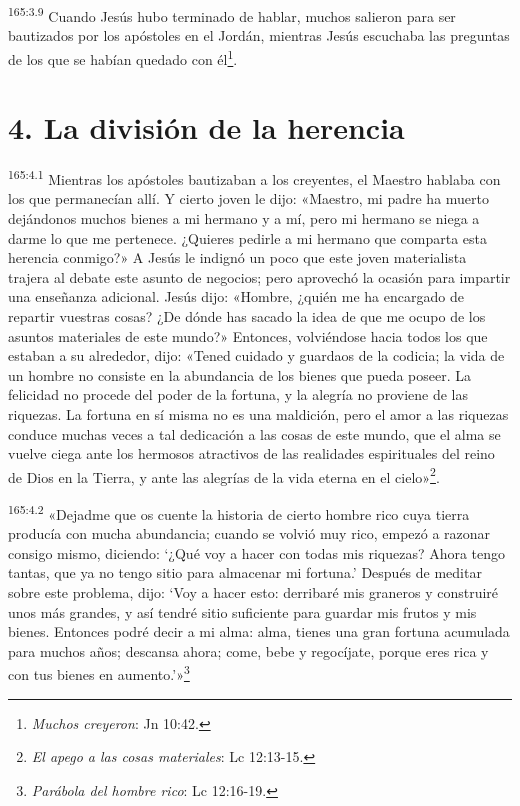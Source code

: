 \par 
\textsuperscript{165:3.9} Cuando Jesús hubo terminado de hablar, muchos salieron para ser bautizados por los apóstoles en el Jordán, mientras Jesús escuchaba las preguntas de los que se habían quedado con él\footnote{\textit{Muchos creyeron}: Jn 10:42.}.

\section*{4. La división de la herencia}
\par 
\textsuperscript{165:4.1} Mientras los apóstoles bautizaban a los creyentes, el Maestro hablaba con los que permanecían allí. Y cierto joven le dijo: «Maestro, mi padre ha muerto dejándonos muchos bienes a mi hermano y a mí, pero mi hermano se niega a darme lo que me pertenece. ¿Quieres pedirle a mi hermano que comparta esta herencia conmigo?» A Jesús le indignó un poco que este joven materialista trajera al debate este asunto de negocios; pero aprovechó la ocasión para impartir una enseñanza adicional. Jesús dijo: «Hombre, ¿quién me ha encargado de repartir vuestras cosas? ¿De dónde has sacado la idea de que me ocupo de los asuntos materiales de este mundo?» Entonces, volviéndose hacia todos los que estaban a su alrededor, dijo: «Tened cuidado y guardaos de la codicia; la vida de un hombre no consiste en la abundancia de los bienes que pueda poseer. La felicidad no procede del poder de la fortuna, y la alegría no proviene de las riquezas. La fortuna en sí misma no es una maldición, pero el amor a las riquezas conduce muchas veces a tal dedicación a las cosas de este mundo, que el alma se vuelve ciega ante los hermosos atractivos de las realidades espirituales del reino de Dios en la Tierra, y ante las alegrías de la vida eterna en el cielo»\footnote{\textit{El apego a las cosas materiales}: Lc 12:13-15.}.

\par 
\textsuperscript{165:4.2} «Dejadme que os cuente la historia de cierto hombre rico cuya tierra producía con mucha abundancia; cuando se volvió muy rico, empezó a razonar consigo mismo, diciendo: `¿Qué voy a hacer con todas mis riquezas? Ahora tengo tantas, que ya no tengo sitio para almacenar mi fortuna.' Después de meditar sobre este problema, dijo: `Voy a hacer esto: derribaré mis graneros y construiré unos más grandes, y así tendré sitio suficiente para guardar mis frutos y mis bienes. Entonces podré decir a mi alma: alma, tienes una gran fortuna acumulada para muchos años; descansa ahora; come, bebe y regocíjate, porque eres rica y con tus bienes en aumento.'»\footnote{\textit{Parábola del hombre rico}: Lc 12:16-19.}

